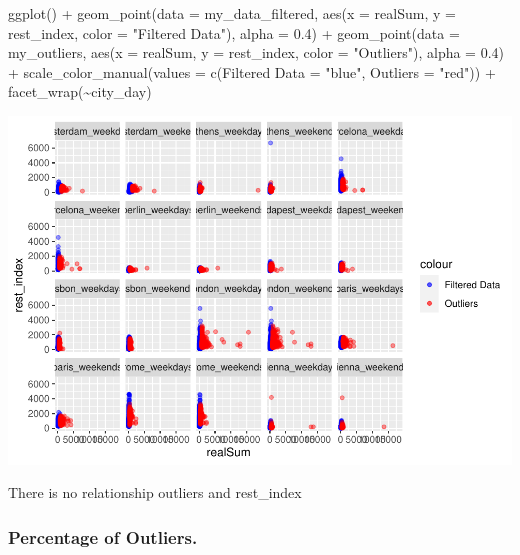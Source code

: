 \documentclass[
]{article}
\newenvironment{Shaded}{\begin{snugshade}}{\end{snugshade}}
\newcommand{\AttributeTok}[1]{\textcolor[rgb]{0.77,0.63,0.00}{#1}}
\newcommand{\FloatTok}[1]{\textcolor[rgb]{0.00,0.00,0.81}{#1}}
\newcommand{\FunctionTok}[1]{\textcolor[rgb]{0.00,0.00,0.00}{#1}}
\newcommand{\NormalTok}[1]{#1}
\newcommand{\OtherTok}[1]{\textcolor[rgb]{0.56,0.35,0.01}{#1}}
\newcommand{\SpecialCharTok}[1]{\textcolor[rgb]{0.00,0.00,0.00}{#1}}
\newcommand{\StringTok}[1]{\textcolor[rgb]{0.31,0.60,0.02}{#1}}
\begin{document}
\begin{Shaded}
\begin{Highlighting}[]
\FunctionTok{ggplot}\NormalTok{() }\SpecialCharTok{+} \FunctionTok{geom\_point}\NormalTok{(}\AttributeTok{data =}\NormalTok{ my\_data\_filtered, }\FunctionTok{aes}\NormalTok{(}\AttributeTok{x =}\NormalTok{ realSum,}
    \AttributeTok{y =}\NormalTok{ rest\_index, }\AttributeTok{color =} \StringTok{"Filtered Data"}\NormalTok{), }\AttributeTok{alpha =} \FloatTok{0.4}\NormalTok{) }\SpecialCharTok{+}
    \FunctionTok{geom\_point}\NormalTok{(}\AttributeTok{data =}\NormalTok{ my\_outliers, }\FunctionTok{aes}\NormalTok{(}\AttributeTok{x =}\NormalTok{ realSum, }\AttributeTok{y =}\NormalTok{ rest\_index,}
        \AttributeTok{color =} \StringTok{"Outliers"}\NormalTok{), }\AttributeTok{alpha =} \FloatTok{0.4}\NormalTok{) }\SpecialCharTok{+} \FunctionTok{scale\_color\_manual}\NormalTok{(}\AttributeTok{values =} \FunctionTok{c}\NormalTok{(}\StringTok{\textasciigrave{}}\AttributeTok{Filtered Data}\StringTok{\textasciigrave{}} \OtherTok{=} \StringTok{"blue"}\NormalTok{,}
    \AttributeTok{Outliers =} \StringTok{"red"}\NormalTok{)) }\SpecialCharTok{+} \FunctionTok{facet\_wrap}\NormalTok{(}\SpecialCharTok{\textasciitilde{}}\NormalTok{city\_day)}
\end{Highlighting}
\end{Shaded}

\includegraphics{Project_files/figure-latex/unnamed-chunk-20-2.pdf}

There is no relationship outliers and rest\_index

\hypertarget{percentage-of-outliers.}{%
\subsubsection{Percentage of Outliers.}\label{percentage-of-outliers.}}
\end{document}
